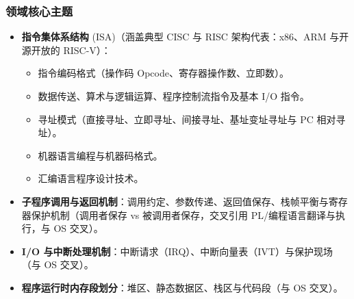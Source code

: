 \subsubsection{领域核心主题}
\begin{itemize}
    \item \textbf{指令集体系结构} (ISA)（涵盖典型 CISC 与 RISC 架构代表：x86、ARM 与开源开放的 RISC-V）：
    \begin{itemize}
        \item 指令编码格式（操作码 Opcode、寄存器操作数、立即数）。
        \item 数据传送、算术与逻辑运算、程序控制流指令及基本 I/O 指令。
        \item 寻址模式（直接寻址、立即寻址、间接寻址、基址变址寻址与 PC 相对寻址）。
        \item 机器语言编程与机器码格式。
        \item 汇编语言程序设计技术。
    \end{itemize}
    \item \textbf{子程序调用与返回机制}：调用约定、参数传递、返回值保存、栈帧平衡与寄存器保护机制（调用者保存 vs 被调用者保存，交叉引用 PL/编程语言翻译与执行，与 OS 交叉）。
    \item \textbf{I/O 与中断处理机制}：中断请求（IRQ）、中断向量表（IVT）与保护现场（与 OS 交叉）。
    \item \textbf{程序运行时内存段划分}：堆区、静态数据区、栈区与代码段（与 OS 交叉）。
\end{itemize}

